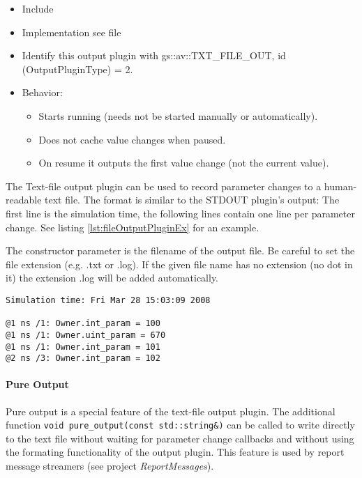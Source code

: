 \begin{itemize}
  \item Include 
  \item Implementation see file 
  \item Identify this output plugin with {\sffamily gs::av::TXT\_FILE\_OUT}, \newline
           id ({\sffamily OutputPluginType}) = 2.
  \item Behavior:
    \begin{itemize}
        \item Starts running (needs not be started manually or automatically).
        \item Does not cache value changes when paused.
        \item On resume it outputs the first value change (not the current value).
    \end{itemize}
\end{itemize}

The Text-file output plugin can be used to record parameter changes to a human-readable text file. The format is similar to the STDOUT plugin's output: The first line is the simulation time, the following lines contain one line per parameter change. See listing \ref{lst:fileOutputPluginEx} for an example.

The constructor parameter is the filename of the output file. Be careful to set the file extension (e.g. {\sffamily .txt} or {\sffamily .log}). If the given file name has no extension (no dot in it) the extension {\sffamily .log} will be added automatically.

\begin{lstlisting}[caption={Text-file output example}, label=lst:fileOutputPluginEx]
Simulation time: Fri Mar 28 15:03:09 2008

@1 ns /1: Owner.int_param = 100
@1 ns /1: Owner.uint_param = 670
@1 ns /1: Owner.int_param = 101
@2 ns /3: Owner.int_param = 102
\end{lstlisting}

\paragraph{Pure Output} Pure output is a special feature of the text-file output plugin. The additional function \lstinline[language=TeX]|void pure_output(const std::string&)| can be called to write directly to the text file without waiting for parameter change callbacks and without using the formating functionality of the output plugin. This feature is used by report message streamers (see project \textsl{ReportMessages}). %

